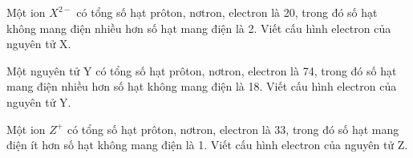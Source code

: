 \begin{bt}%
	Một ion $X^{2-}$ có tổng số hạt prôton, nơtron, electron là 20, trong đó số hạt không mang điện nhiều hơn số hạt mang điện là 2. Viết cấu hình electron của nguyên tử X.
\end{bt}
\begin{bt}%
	Một nguyên tử Y có tổng số hạt prôton, nơtron, electron là 74, trong đó số hạt mang điện nhiều hơn số hạt không mang điện là 18. Viết cấu hình electron của nguyên tử Y.
\end{bt}
\begin{bt}%
	Một ion $Z^+$ có tổng số hạt prôton, nơtron, electron là 33, trong đó số hạt mang điện ít hơn số hạt không mang điện là 1. Viết cấu hình electron của nguyên tử Z.
\end{bt}
